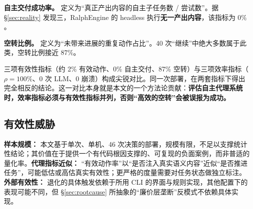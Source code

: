 \textbf{自主交付成功率。} 定义为“真正产出内容的自主子任务数 / 尝试数”。据 \S\ref{sec:reality} 发现三，RalphEngine 的 headless 执行\textbf{无一产出内容}，该指标为 $0\%$。

\textbf{空转比例。} 定义为“未带来进展的重复动作占比”。40 次“继续”中绝大多数属于此类，空转比例接近 $87\%$。

三项有效性指标（约 2\% 有效动作、0\% 自主交付、87\% 空转）与三项效率指标（$\rho=100\%$、0 次 LLM、0 崩溃）构成尖锐对比。同一次部署，在两套指标下得出完全相反的结论。这一对比本身就是本文的一个方法论贡献：\textbf{评估自主代理系统时，效率指标必须与有效性指标并列，否则“高效的空转”会被误报为成功。}

\subsection{有效性威胁}

\textbf{样本规模：} 本文基于单次、单机、46 次决策的部署，规模有限，不足以支撑统计性结论；其价值在于提供一个有代码根因支撑的、可复现的负面案例，而非普适的量化率。\textbf{代理指标近似：} “有效动作率”以“是否注入真实语义内容”近似“是否推进任务”，可能低估或高估真实有效性；更严格的度量需要对任务状态做独立标注。\textbf{外部有效性：} 退化的具体触发依赖于所用 CLI 的界面与规则实现，其他配置下的表现可能不同，但 \S\ref{sec:rootcause} 所抽象的“廉价层垄断”反模式不依赖具体实现。
